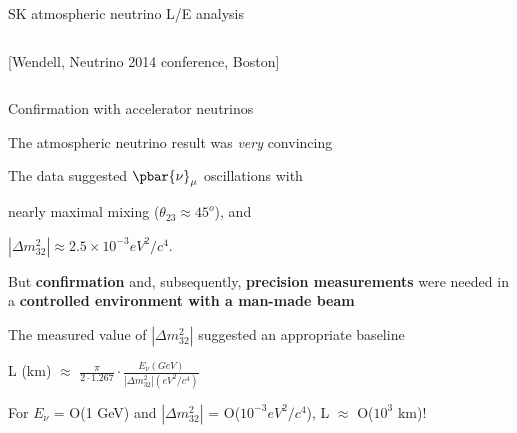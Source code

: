 \begin{frame}[t]{SK atmospheric neutrino L/E analysis}
\begin{columns}
\begin{column}{0.50\textwidth}
    {\scriptsize \color{blue}[Wendell, Neutrino 2014 conference, Boston]}
  \end{column}
\end{columns}
\end{frame}

%
%
%

\begin{frame}[t]{Confirmation with accelerator neutrinos}

\begin{itemize}
  {\small
  \item The atmospheric neutrino result was {\em very} convincing\\
  \item The data suggested $\pbar{\nu}_{\mu}$ oscillations with
     \begin{itemize}
     {\small
         \vspace{0.2cm}
         \item nearly maximal mixing ({\color{red}$\theta_{23} \approx 45^{o}$}), and
         \vspace{0.2cm}
         \item {\color{red} $|{\Delta}m^{2}_{32}| \approx 2.5 \times 10^{-3} eV^{2}/c^{4}$}.
     }
     \end{itemize}
     \vspace{0.3cm}
  \item But {\bf confirmation} and, subsequently, {\bf precision measurements} were needed in
        a {\bf controlled environment with a man-made beam}
  \vspace{0.3cm}
  \item The measured value of $|{\Delta}m^{2}_{32}|$ suggested an appropriate baseline
     \begin{itemize}
        {\small
         \vspace{0.2cm}
         \item L (km) $\approx$ $\frac{\pi}{2 \cdot 1.267} \cdot
                 \frac{E_{\nu} (GeV)}{|{\Delta}m^{2}_{32}| (eV^{2}/c^{4})}$
         \vspace{0.2cm}
         \item For $E_{\nu}$ = O(1 GeV) and
               $|{\Delta}m^{2}_{32}|$ = O($10^{-3} eV^{2}/c^{4}$),
               L $\approx$ O($10^{3}$ km)!
        }
     \end{itemize}
  }
\end{itemize}
\end{frame}

%
%
%

